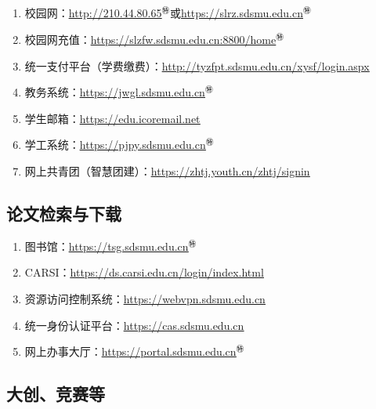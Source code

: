 \subsection[日常使用]{\textbf{}}
\begin{enumerate}
    \item 校园网：\uline{\href{http://210.44.80.65}{http://210.44.80.65}$^㊕$}或\uline{\href{https://slrz.sdsmu.edu.cn}{https://slrz.sdsmu.edu.cn}$^㊕$}
    \item 校园网充值：\uline{\href{https://slzfw.sdsmu.edu.cn:8800/home}{https://slzfw.sdsmu.edu.cn:8800/home}$^㊕$}
    \item 统一支付平台（学费缴费）：\uline{\href{http://tyzfpt.sdsmu.edu.cn/xysf/login.aspx}{http://tyzfpt.sdsmu.edu.cn/xysf/login.aspx}}
    \item 教务系统：\uline{\href{https://jwgl.sdsmu.edu.cn}{https://jwgl.sdsmu.edu.cn}$^㊕$}
    \item 学生邮箱：\uline{\href{https://edu.icoremail.net}{https://edu.icoremail.net}}
    \item 学工系统：\uline{\href{https://pjpy.sdsmu.edu.cn}{https://pjpy.sdsmu.edu.cn}$^㊕$}
    \item 网上共青团（智慧团建）：\uline{\href{https://zhtj.youth.cn/zhtj/signin}{https://zhtj.youth.cn/zhtj/signin}}
\end{enumerate}

\subsection[论文检索与下载]{论文检索与下载}
\begin{enumerate}
    \item 图书馆：\uline{\href{https://tsg.sdsmu.edu.cn}{https://tsg.sdsmu.edu.cn}$^㊕$}
    \item CARSI：\uline{\href{https://ds.carsi.edu.cn/login/index.html}{https://ds.carsi.edu.cn/login/index.html}}
    \item 资源访问控制系统：\uline{\href{https://webvpn.sdsmu.edu.cn}{https://webvpn.sdsmu.edu.cn}}
    \item 统一身份认证平台：\uline{\href{https://cas.sdsmu.edu.cn}{https://cas.sdsmu.edu.cn}}
    \item 网上办事大厅：\uline{\href{https://portal.sdsmu.edu.cn}{https://portal.sdsmu.edu.cn}$^㊕$}
\end{enumerate}

\subsection[大创、竞赛等]{大创、竞赛等\footnotemark}
